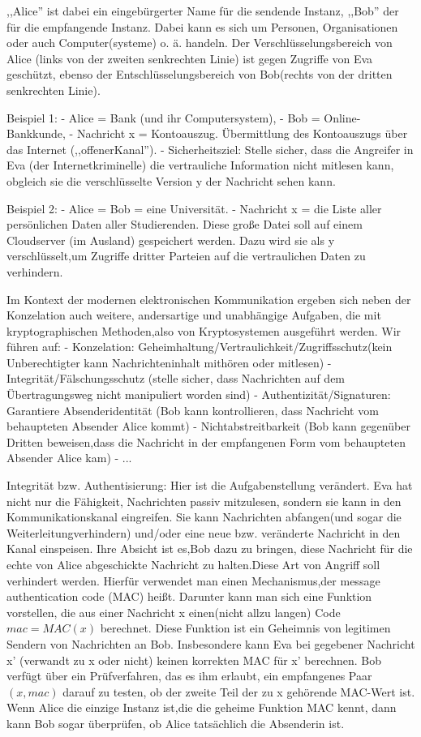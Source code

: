 \documentclass[a4paper]{article}
\begin{document}
\begin{multicols}{3}
    ,,Alice''  ist dabei ein eingebürgerter Name für die sendende Instanz, ,,Bob'' der für die empfangende Instanz. Dabei kann es sich um Personen, Organisationen oder auch Computer(systeme) o. ä. handeln. Der Verschlüsselungsbereich von Alice (links von der zweiten senkrechten Linie) ist gegen Zugriffe von Eva geschützt, ebenso der Entschlüsselungsbereich von Bob(rechts von der dritten senkrechten Linie).

    Beispiel 1:
    - Alice = Bank (und ihr Computersystem),
    - Bob = Online-Bankkunde,
    - Nachricht x = Kontoauszug. Übermittlung des Kontoauszugs über das Internet (,,offenerKanal'').
    - Sicherheitsziel: Stelle sicher, dass die Angreifer in Eva (der Internetkriminelle) die vertrauliche Information nicht mitlesen kann, obgleich sie die verschlüsselte Version y der Nachricht sehen kann.

    Beispiel 2:
    - Alice = Bob = eine Universität.
    - Nachricht x = die Liste aller persönlichen Daten aller Studierenden. Diese große Datei soll auf einem Cloudserver (im Ausland) gespeichert werden. Dazu wird sie als y verschlüsselt,um Zugriffe dritter Parteien auf die vertraulichen Daten zu verhindern.

    Im Kontext der modernen elektronischen Kommunikation ergeben sich neben der Konzelation auch weitere, andersartige und unabhängige Aufgaben, die mit kryptographischen Methoden,also von Kryptosystemen ausgeführt werden. Wir führen auf:
    - Konzelation: Geheimhaltung/Vertraulichkeit/Zugriffsschutz(kein Unberechtigter kann Nachrichteninhalt mithören oder mitlesen)
    - Integrität/Fälschungsschutz (stelle sicher, dass Nachrichten auf dem Übertragungsweg nicht manipuliert worden sind)
    - Authentizität/Signaturen: Garantiere Absenderidentität (Bob kann kontrollieren, dass Nachricht vom behaupteten Absender Alice kommt)
    - Nichtabstreitbarkeit (Bob kann gegenüber Dritten beweisen,dass die Nachricht in der empfangenen Form vom behaupteten Absender Alice kam)
    - ...

    Integrität bzw. Authentisierung: Hier ist die Aufgabenstellung verändert. Eva hat nicht nur die Fähigkeit, Nachrichten passiv mitzulesen, sondern sie kann in den Kommunikationskanal eingreifen. Sie kann Nachrichten abfangen(und sogar die Weiterleitungverhindern) und/oder eine neue bzw. veränderte Nachricht in den Kanal einspeisen. Ihre Absicht ist es,Bob dazu zu bringen, diese Nachricht für die echte von Alice abgeschickte Nachricht zu halten.Diese Art von Angriff soll verhindert werden. Hierfür verwendet man einen Mechanismus,der message authentication code (MAC) heißt. Darunter kann man sich eine Funktion vorstellen, die aus einer Nachricht x einen(nicht allzu langen) Code $mac=MAC(x)$ berechnet. Diese Funktion ist ein Geheimnis von legitimen Sendern von Nachrichten an Bob. Insbesondere kann Eva bei gegebener Nachricht x' (verwandt zu x oder nicht) keinen korrekten MAC für x' berechnen. Bob verfügt über ein Prüfverfahren, das es ihm erlaubt, ein empfangenes Paar $(x,mac)$ darauf zu testen, ob der zweite Teil der zu x gehörende MAC-Wert ist. Wenn Alice die einzige Instanz ist,die die geheime Funktion MAC kennt, dann kann Bob sogar überprüfen, ob Alice tatsächlich die Absenderin ist.


\end{multicols}
\end{document}
